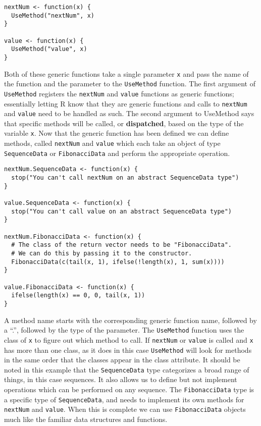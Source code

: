 \begin{verbatim}
nextNum <- function(x) {
  UseMethod("nextNum", x)
}

value <- function(x) {
  UseMethod("value", x)
}
\end{verbatim}

Both of these generic functions take a single parameter \texttt{x} and
pass the name of the function and the parameter to the
\texttt{UseMethod} function. The first argument of \texttt{UseMethod}
registers the \texttt{nextNum} and \texttt{value} functions as generic
functions; essentially letting R know that they are generic functions
and calls to \texttt{nextNum} and \texttt{value} need to be handled as
such. The second argument to UseMethod says that specific methods will
be called, or \textbf{dispatched}, based on the type of the variable
\texttt{x}. Now that the generic function has been defined we can define
methods, called \texttt{nextNum} and \texttt{value} which each take an
object of type \texttt{SequenceData} or \texttt{FibonacciData} and
perform the appropriate operation.

\begin{verbatim}
nextNum.SequenceData <- function(x) {
  stop("You can't call nextNum on an abstract SequenceData type")
}

value.SequenceData <- function(x) {
  stop("You can't call value on an abstract SequenceData type")
}

nextNum.FibonacciData <- function(x) {
  # The class of the return vector needs to be "FibonacciData".
  # We can do this by passing it to the constructor.
  FibonacciData(c(tail(x, 1), ifelse(!length(x), 1, sum(x))))
}

value.FibonacciData <- function(x) {
  ifelse(length(x) == 0, 0, tail(x, 1))
}
\end{verbatim}

A method name starts with the corresponding generic function name,
followed by a ``.'', followed by the type of the parameter. The
\texttt{UseMethod} function uses the class of \texttt{x} to figure out
which method to call. If \texttt{nextNum} or \texttt{value} is called
and \texttt{x} has more than one class, as it does in this case
\texttt{UseMethod} will look for methods in the same order that the
classes appear in the class attribute. It should be noted in this
example that the \texttt{SequenceData} type categorizes a broad range of
things, in this case sequences. It also allows us to define but not
implement operations which can be performed on any sequence. The
\texttt{FibonacciData} type is a specific type of \texttt{SequenceData},
and needs to implement its own methods for \texttt{nextNum} and
\texttt{value}. When this is complete we can use \texttt{FibonacciData}
objects much like the familiar data structures and functions.


